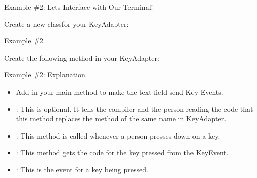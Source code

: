 \begin{frame}[fragile]{Example \#2: Lets Interface with Our Terminal!}
\begin{center}Create a new classfor your KeyAdapter:\end{center}
\begin{semiverbatim}\end{semiverbatim}

\end{frame}


\begin{frame}[fragile]{Example \#2}
\begin{center}Create the following method in your KeyAdapter:\end{center}
\begin{semiverbatim}\end{semiverbatim}
\end{frame}

\begin{frame}{Example \#2: Explanation}
\begin{itemize}
\item Add  in your main method to make the text field send Key Events. \pause
\item {}: This is optional. It tells the compiler and the person reading the code that this method replaces the method of the same name in KeyAdapter. \pause
\item {}: This method is called whenever a person presses down on a key. \pause
\item {}: This method gets the code for the key pressed from the KeyEvent. \pause
\item {}: This is the event for a key being pressed.
\end{itemize}
\end{frame}

